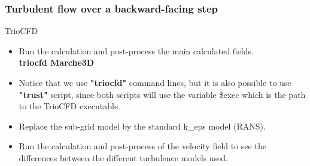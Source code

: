 \documentclass[10pt, hyperref={unicode=true,pdfusetitle, bookmarks=true,bookmarksnumbered=false,bookmarksopen=false, breaklinks=false,pdfborder={0 0 1},backref=true,colorlinks=true,linkcolor=darkblue,pageanchor}]{beamer}
\begin{document}
\begin{frame}
\frametitle{Turbulent flow over a backward-facing step}
\begin{block}{TrioCFD}

\begin{itemize}

\item Run the calculation and post-process the main calculated fields.\\
\textbf{triocfd Marche3D} \\

\item Notice that we use \textbf{"triocfd"} command lines, but it is also possible to use \textbf{"trust"} script, since both scripts will use the variable \$exec which is the path to the TrioCFD executable.

\item Replace the sub-grid model by the standard k\_eps model (RANS).
\item Run the calculation and post-process of the velocity field to see the differences between the different turbulence models used.
\end{itemize}

\end{block}
\end{frame}
\end{document}
